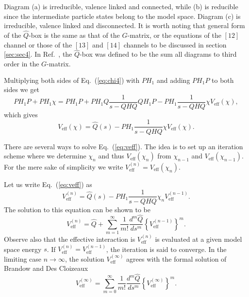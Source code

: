 \documentclass{article}
\begin{document}
Diagram (a) is irreducible, valence linked and connected,
while (b) is reducible since
the intermediate particle states belong to the model space.
Diagram (c) is irreducible, valence linked and disconnected.
It is worth noting that general form of the $\hat{Q}$-box
is the same as that of the $G$-matrix, or the equations
of the $[12]$ channel or those of the $[13]$ and $[14]$
channels to be discussed in section \ref{sec:sec4}.
In Ref.\ \cite{hko95}, the $\hat{Q}$-box was defined
to be the sum all diagrams to third order in the $G$-matrix.


Multiplying both sides of Eq.\ (\ref{eq:chi4}) with $PH_1$ and
adding $PH_1 P$ to both sides we get
\[
    PH_1 P + PH_1 \chi =
    PH_1 P + PH_1 Q\frac{1}{s - QHQ}QH_1 P -
    PH_1 \frac{1}{s -QHQ}\chi V_{\mathrm{eff}}(\chi ),
\]
which gives
\begin{equation}
     V_{\mathrm{eff}}(\chi )=\hat{Q}(s)-
     PH_1 \frac{1}{s -QHQ}\chi V_{\mathrm{eff}}(\chi ).
     \label{eq:veff}
\end{equation}

There are several ways to solve Eq.\ (\ref{eq:veff}). The idea is
to set up an iteration scheme where we determine $\chi_n$ and
thus $V_{\mathrm{eff}}(\chi_n )$ from
$\chi_{n-1}$ and $V_{\mathrm{eff}}(\chi_{n-1})$.
For the mere sake of simplicity we write
$V_{\mathrm{eff}}^{(n)}=V_{\mathrm{eff}}(\chi_{n})$.

Let us write Eq.\ (\ref{eq:veff}) as
\[
   V_{\mathrm{eff}}^{(n)}=\hat{Q}(s)-
   PH_1 \frac{1}{s -QHQ}\chi_n V_{\mathrm{eff}}^{(n-1)}.
\]
The solution to this equation can be shown to be \cite{ls80}
\begin{equation}
    V_{\mathrm{eff}}^{(n)}=\hat{Q}+{\displaystyle\sum_{m=1}^{\infty}}
    \frac{1}{m!}\frac{d^m\hat{Q}}{ds^m}\left\{
    V_{\mathrm{eff}}^{(n-1)}\right\}^m .
    \label{eq:fd}
\end{equation}
Observe also that the
effective interaction is $V_{\mathrm{eff}}^{(n)}$
is evaluated at a given model space energy
$s$. If
$V_{\mathrm{eff}}^{(n)}=V_{\mathrm{eff}}^{(n-1)}$, the iteration is said to
converge. In the limiting case $n\rightarrow \infty$, the
solution $V_{\mathrm{eff}}^{(\infty)}$ agrees with the formal solution of
Brandow
\cite{brandow67} and Des Cloizeaux \cite{des}
\begin{equation}
    V_{\mathrm{eff}}^{(\infty)}=\sum_{m=0}^{\infty}\frac{1}{m!}
    \frac{d^{m}\hat{Q}}{ds^{m}}\left\{
    V_{\mathrm{eff}}^{(\infty)}\right\}^{m}.\label{eq:pert}
\end{equation}
\end{document}
